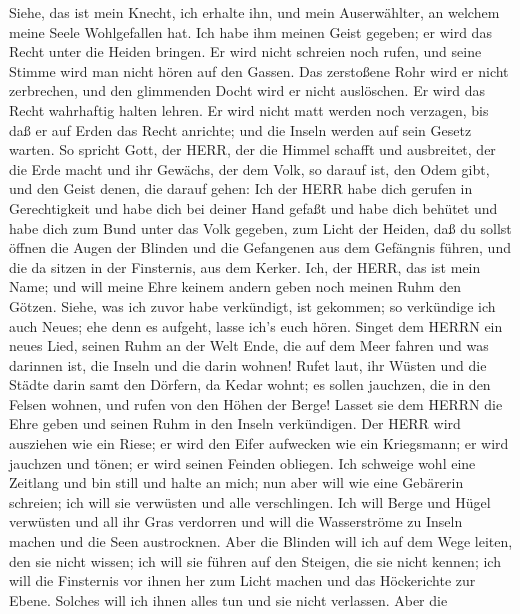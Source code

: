  Siehe, das ist mein Knecht, ich erhalte ihn, und mein
Auserwählter, an welchem meine Seele Wohlgefallen hat. Ich habe ihm
meinen Geist gegeben; er wird das Recht unter die Heiden bringen.
 Er wird nicht schreien noch rufen, und seine Stimme wird
man nicht hören auf den Gassen.  Das zerstoßene Rohr wird er
nicht zerbrechen, und den glimmenden Docht wird er nicht auslöschen. Er
wird das Recht wahrhaftig halten lehren.  Er wird nicht matt
werden noch verzagen, bis daß er auf Erden das Recht anrichte; und die
Inseln werden auf sein Gesetz warten.  So spricht Gott, der
HERR, der die Himmel schafft und ausbreitet, der die Erde macht und ihr
Gewächs, der dem Volk, so darauf ist, den Odem gibt, und den Geist
denen, die darauf gehen:  Ich der HERR habe dich gerufen in
Gerechtigkeit und habe dich bei deiner Hand gefaßt und habe dich behütet
und habe dich zum Bund unter das Volk gegeben, zum Licht der Heiden,
 daß du sollst öffnen die Augen der Blinden und die
Gefangenen aus dem Gefängnis führen, und die da sitzen in der
Finsternis, aus dem Kerker.  Ich, der HERR, das ist mein
Name; und will meine Ehre keinem andern geben noch meinen Ruhm den
Götzen.  Siehe, was ich zuvor habe verkündigt, ist gekommen;
so verkündige ich auch Neues; ehe denn es aufgeht, lasse ich's euch
hören.  Singet dem HERRN ein neues Lied, seinen Ruhm an der
Welt Ende, die auf dem Meer fahren und was darinnen ist, die Inseln und
die darin wohnen!  Rufet laut, ihr Wüsten und die Städte
darin samt den Dörfern, da Kedar wohnt; es sollen jauchzen, die in den
Felsen wohnen, und rufen von den Höhen der Berge!  Lasset
sie dem HERRN die Ehre geben und seinen Ruhm in den Inseln verkündigen.
 Der HERR wird ausziehen wie ein Riese; er wird den Eifer
aufwecken wie ein Kriegsmann; er wird jauchzen und tönen; er wird seinen
Feinden obliegen.  Ich schweige wohl eine Zeitlang und bin
still und halte an mich; nun aber will wie eine Gebärerin schreien; ich
will sie verwüsten und alle verschlingen.  Ich will Berge
und Hügel verwüsten und all ihr Gras verdorren und will die Wasserströme
zu Inseln machen und die Seen austrocknen.  Aber die
Blinden will ich auf dem Wege leiten, den sie nicht wissen; ich will sie
führen auf den Steigen, die sie nicht kennen; ich will die Finsternis
vor ihnen her zum Licht machen und das Höckerichte zur Ebene. Solches
will ich ihnen alles tun und sie nicht verlassen.  Aber die
